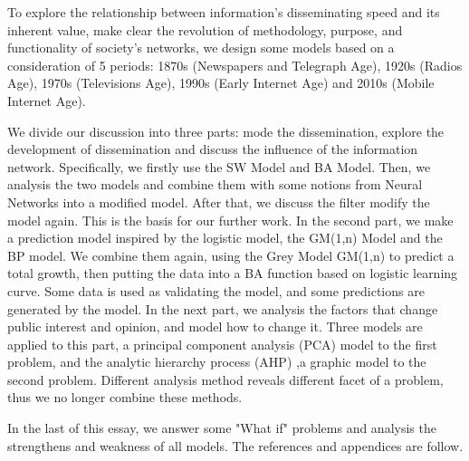 To explore the relationship between information's disseminating speed and its inherent value, make clear the revolution of methodology, purpose, and functionality of society's networks, we design some models based on a consideration of 5 periods: 1870s (Newspapers and Telegraph Age), 1920s (Radios Age), 1970s (Televisions Age), 1990s (Early Internet Age) and 2010s (Mobile Internet Age).
\par We divide our discussion into three parts: mode the dissemination, explore the development of dissemination and discuss the influence of the information network. Specifically, we firstly use the SW Model and BA Model. Then, we analysis the two models and combine them with some notions from Neural Networks into a modified model. After that, we discuss the filter modify the model again. This is the basis for our further work. In the second part, we make a prediction model inspired by the logistic model, the GM(1,n) Model and the BP model. We combine them again, using the Grey Model GM(1,n) to predict a total growth, then putting the data into a BA function based on logistic learning curve. Some data is used as validating the model, and some predictions are generated by the model. In the next part, we analysis the factors that change public interest and opinion, and model how to change it. Three models are applied to this part, a principal component analysis (PCA) model to the first problem, and the analytic hierarchy process (AHP) ,a graphic model to the second problem. Different analysis method reveals different facet of a problem, thus we no longer combine these methods.
\par In the last of this essay, we answer some "What if" problems and analysis the strengthens and weakness of all models. The references and appendices are follow.
\newpage






